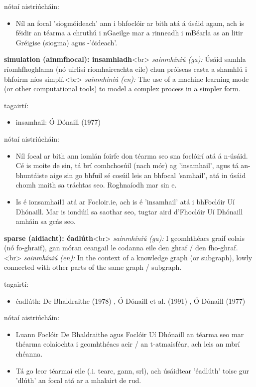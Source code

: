 \documentclass{article}
\begin{document}
nótaí aistriúcháin:
\begin{itemize}
	\item Níl an focal 'siogmóideach' ann i bhfoclóir ar bith atá á úsáid agam, ach is féidir an téarma a chruthú i nGaeilge mar a rinneadh i mBéarla as an litir Gréigise (siogma) agus -'óideach'.
\end{itemize}


\textbf{simulation (ainmfhocal): insamhladh}<br>
\textit{sainmhíniú (ga):} Úsáid samhla ríomhfhoghlama (nó uirlisí ríomhaireachta eile) chun próiseas casta a shamhlú i bhfoirm níos simplí.<br>
\textit{sainmhíniú (en):} The use of a machine learning mode (or other computational tools) to model a complex process in a simpler form.

tagairtí:
\begin{itemize}
	\item insamhail: Ó Dónaill (1977) \cite{odonaill}
\end{itemize}

nótaí aistriúcháin:
\begin{itemize}
	\item Níl focal ar bith ann iomlán foirfe don téarma seo sna foclóirí atá á n-úsáid. Cé is moite de sin, tá brí comhchosúil (nach mór) ag 'insamhail', agus tá an-bhuntáiste aige sin go bhfuil sé cosúil leis an bhfocal 'samhail', atá in úsáid chomh maith sa tráchtas seo. Roghnaíodh mar sin e.
	\item Is é ionsamhail1 atá ar Focloir.ie, ach is é 'insamhail' atá i bhFoclóir Uí Dhónaill. Mar is iondúil sa saothar seo, tugtar aird d'Fhoclóir Uí Dhónaill amháin sa gcás seo.
\end{itemize}


\textbf{sparse (aidiacht): éadlúth}<br>
\textit{sainmhíniú (ga):} I gcomhthéacs graif eolais (nó fo-ghraif), gan móran ceangail le codanna eile den ghraf / den fho-ghraf.<br>
\textit{sainmhíniú (en):} In the context of a knowledge graph (or subgraph), lowly connected with other parts of the same graph / subgraph.

tagairtí:
\begin{itemize}
	\item éadlúth: De Bhaldraithe (1978) \cite{de-bhaldraithe}, Ó Dónaill et al. (1991) \cite{focloir-beag}, Ó Dónaill (1977) \cite{odonaill}
\end{itemize}

nótaí aistriúcháin:
\begin{itemize}
	\item Luann Foclóir De Bhaldraithe agus Foclóir Uí Dhónaill an téarma seo mar théarma eolaíochta i gcomhthéacs aeir / an t-atmaisféar, ach leis an mbrí chéanna.
	\item Tá go leor téarmaí eile (.i. tearc, gann, srl), ach úsáidtear 'éadlúth' toisc gur 'dlúth' an focal atá ar a mhalairt de rud.
\end{itemize}
\end{document}
